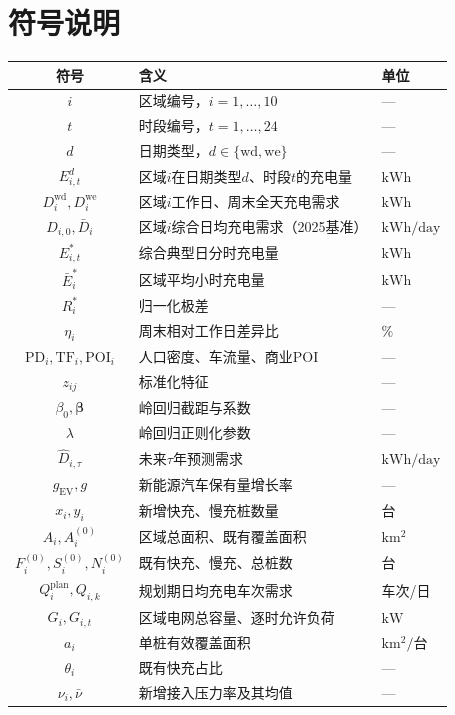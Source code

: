 \documentclass[a4paper,12pt]{ctexart}
\begin{document}
\section{符号说明}
\begin{longtable}{cll}
\toprule
符号 & 含义 & 单位 \\
\midrule
$i$ & 区域编号，$i=1,\ldots,10$ & --- \\
$t$ & 时段编号，$t=1,\ldots,24$ & --- \\
$d$ & 日期类型，$d\in\{\mathrm{wd},\mathrm{we}\}$ & --- \\
$E_{i,t}^{d}$ & 区域$i$在日期类型$d$、时段$t$的充电量 & $\mathrm{kWh}$ \\
$D_{i}^{\mathrm{wd}},D_{i}^{\mathrm{we}}$ & 区域$i$工作日、周末全天充电需求 & $\mathrm{kWh}$ \\
$D_{i,0},\bar{D}_{i}$ & 区域$i$综合日均充电需求（2025基准） & $\mathrm{kWh/day}$ \\
$E_{i,t}^{*}$ & 综合典型日分时充电量 & $\mathrm{kWh}$ \\
$\bar{E}_{i}^{*}$ & 区域平均小时充电量 & $\mathrm{kWh}$ \\
$R_{i}^{*}$ & 归一化极差 & --- \\
$\eta_{i}$ & 周末相对工作日差异比 & $\%$ \\
$\mathrm{PD}_{i},\mathrm{TF}_{i},\mathrm{POI}_{i}$ & 人口密度、车流量、商业POI & --- \\
$z_{ij}$ & 标准化特征 & --- \\
$\beta_{0},\boldsymbol{\beta}$ & 岭回归截距与系数 & --- \\
$\lambda$ & 岭回归正则化参数 & --- \\
$\widehat{D}_{i,\tau}$ & 未来$\tau$年预测需求 & $\mathrm{kWh/day}$ \\
$g_{\mathrm{EV}},g$ & 新能源汽车保有量增长率 & --- \\
$x_{i},y_{i}$ & 新增快充、慢充桩数量 & 台 \\
$A_{i},A_{i}^{(0)}$ & 区域总面积、既有覆盖面积 & $\mathrm{km^{2}}$ \\
$F_{i}^{(0)},S_{i}^{(0)},N_{i}^{(0)}$ & 既有快充、慢充、总桩数 & 台 \\
$Q_{i}^{\mathrm{plan}},Q_{i,k}$ & 规划期日均充电车次需求 & 车次/日 \\
$G_{i},G_{i,t}$ & 区域电网总容量、逐时允许负荷 & $\mathrm{kW}$ \\
$a_{i}$ & 单桩有效覆盖面积 & $\mathrm{km^{2}/台}$ \\
$\theta_{i}$ & 既有快充占比 & --- \\
$\nu_{i},\bar{\nu}$ & 新增接入压力率及其均值 & --- \\

\end{longtable}
\end{document}

